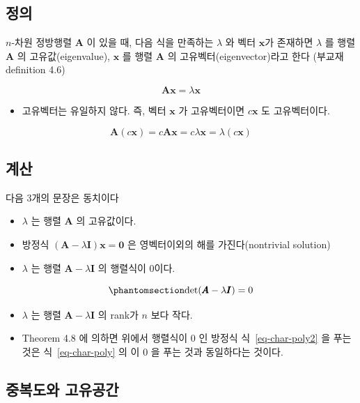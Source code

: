 \documentclass[
  11pt,
  a4paper,
  oneside]{scrbook}
\providecommand{\tightlist}{%
  \setlength{\itemsep}{0pt}\setlength{\parskip}{0pt}}\usepackage{longtable,booktabs,array}
\theoremstyle{definition}
\theoremstyle{definition}
\theoremstyle{plain}
\theoremstyle{remark}
\begin{document}
\subsection{정의}\label{uxc815uxc758-1}

\(n\)-차원 정방행렬 \(\pmb A\) 이 있을 때, 다음 식을 만족하는
\(\lambda\) 와 벡터 \(\pmb x\)가 존재하면 \(\lambda\) 를 행렬 \(\pmb A\)
의 고유값(eigenvalue), \(\pmb x\) 를 행렬 \(\pmb A\) 의
고유벡터(eigenvector)라고 한다 (부교재 definition 4.6)

\[ \pmb A \pmb x = \lambda \pmb x \]

\begin{itemize}
\tightlist
\item
  고유벡터는 유일하지 않다. 즉, 벡터 \(\pmb x\) 가 고유벡터이면
  \(c \pmb x\) 도 고유벡터이다.
\end{itemize}

\[ \pmb A (c \pmb x) = c \pmb A \pmb x = c \lambda \pmb x = \lambda (c \pmb x) \]

\subsection{계산}\label{uxacc4uxc0b0}

다음 3개의 문장은 동치이다

\begin{itemize}
\tightlist
\item
  \(\lambda\) 는 행렬 \(\pmb A\) 의 고유값이다.
\item
  방정식 \((\pmb A - \lambda \pmb I)\pmb x = \pmb 0\) 은 영벡터이외의
  해를 가진다(nontrivial solution)
\item
  \(\lambda\) 는 행렬 \(\pmb A - \lambda \pmb I\) 의 행렬식이 0이다.
\end{itemize}

\begin{equation}\phantomsection\label{eq-char-poly2}{ \operatorname{det}(\pmb A - \lambda \pmb I) = 0 }\end{equation}

\begin{itemize}
\item
  \(\lambda\) 는 행렬 \(\pmb A - \lambda \pmb I\) 의 rank가 \(n\) 보다
  작다.
\item
  Theorem 4.8 에 의하면 위에서 행렬식이 0 인 방정식
  식~\ref{eq-char-poly2} 을 푸는 것은 식~\ref{eq-char-poly} 의 이 0 을
  푸는 것과 동일하다는 것이다.
\end{itemize}

\subsection{중복도와
고유공간}\label{uxc911uxbcf5uxb3c4uxc640-uxace0uxc720uxacf5uxac04}
\end{document}

